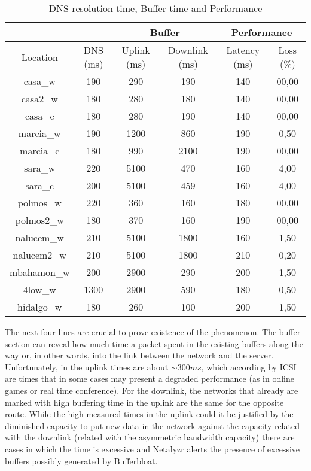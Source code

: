 \begin{table}[ht]
\begin{center}
\begin{tabular}{|c||c||c|c||c|c||}
 \hline
& & \multicolumn{2}{|c||}{Buffer} & \multicolumn{2}{|c||}{Performance} \\ \hline
Location	& DNS (ms) 	& Uplink (ms)	& Downlink (ms) & Latency (ms)	& Loss (\%) \\ \hline \hline
casa\_w		& 190		& 290			& 190 			& 140			& 00,00		\\ \hline
casa2\_w	& 180		& 280			& 180 			& 140			& 00,00		\\ \hline
casa\_c		& 180		& 280			& 190			& 140			& 00,00		\\ \hline
marcia\_w	& 190		& 1200			& 860			& 190			& 0,50 		\\ \hline
marcia\_c	& 180		& 990			& 2100			& 190			& 00,00		\\ \hline
sara\_w		& 220		& 5100			& 470			& 160			& 4,00 		\\ \hline
sara\_c		& 200		& 5100			& 459			& 160			& 4,00 		\\ \hline
polmos\_w	& 220		& 360			& 160			& 180			& 00,00		\\ \hline
polmos2\_w	& 180		& 370			& 160			& 190			& 00,00		\\ \hline
nalucem\_w	& 210		& 5100			& 1800			& 160			& 1,50 		\\ \hline
nalucem2\_w	& 210		& 5100			& 1800			& 210			& 0,20 		\\ \hline
mbahamon\_w	& 200		& 2900			& 290			& 200			& 1,50 		\\ \hline
4low\_w		& 1300		& 2900			& 590			& 180			& 0,50 		\\ \hline
hidalgo\_w	& 180		& 260			& 100			& 200			& 1,50 		\\ \hline
\end{tabular}
\caption[Netalyzr Test:DNS resolution time, Buffer time and Performance]{DNS resolution time, Buffer time and Performance}
\label{table:buffer}
\end{center}
\end{table}

The next four lines are crucial to prove existence of the phenomenon. The
buffer section can reveal how much time a packet spent in the existing buffers
along the way or, in other words, into the link between the network and the
server. Unfortunately, in the uplink times are about $\sim300ms$, which
according by ICSI are times that in some cases may present a degraded
performance (as in online games or real time conference). For the downlink,
the networks that already are marked with high buffering time in the uplink
are the same for the opposite route. While the high measured times in the
uplink could it be justified by the diminished capacity to put new data in the
network against the capacity related with the downlink (related with the
asymmetric bandwidth capacity) there are cases in which the time is
excessive and Netalyzr alerts the presence of excessive buffers possibly
generated by Bufferbloat.

